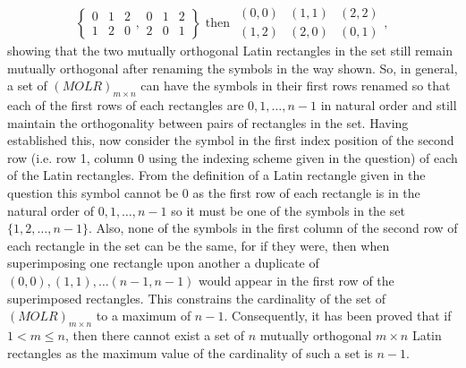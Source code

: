\begin{equation*}
\left\{
\begin{array}{ccc}
0& 1 & 2 \\ 
1 & 2 & 0
\end{array}
,
\begin{array}{ccc}
0 & 1 & 2 \\ 
2 & 0 & 1
\end{array}
\right\}                                                                                                                                                                                                                                                                                                                                                                                                                                                                                                                                                                                                                                                                                                                                                        
\text{ then }
\begin{array}{ccc}
(0,0) & (1,1) & (2,2) \\ 
(1,2) & (2,0) & (0,1)
\end{array},
\end{equation*}
showing that the two mutually orthogonal Latin rectangles in the set still remain mutually orthogonal after renaming the symbols in the way shown. So, in general, a set of $(MOLR)_{m\times n}$ can have the symbols in their first rows renamed so that each of the first rows of each rectangles are $0,1,\ldots,n-1$ in natural order and still maintain the orthogonality between pairs of rectangles in the set. Having established this, now consider the symbol in the first index position of the second row (i.e. row 1, column 0 using the indexing scheme given in the question) of each of the Latin rectangles. From the definition of a Latin rectangle given in the question this symbol cannot be $0$ as the first row of each rectangle is in the natural order of $0,1,\ldots,n-1$ so it must be one of the symbols in the set $\{1,2,\ldots,n-1\}$. Also, none of the symbols in the first column of the second row of each rectangle in the set can be the same, for if they were, then when superimposing one rectangle upon another a duplicate of $(0,0),(1,1),\dots(n-1,n-1)$ would appear in the first row of the superimposed rectangles.  This constrains the cardinality of the set of $(MOLR)_{m\times n}$ to a maximum of $n-1$. Consequently, it has been proved that if $1 < m \leq n$, then there cannot exist a set of $n$ mutually orthogonal $m \times n$ Latin rectangles as the maximum value of the cardinality of such a set is $n-1$.

